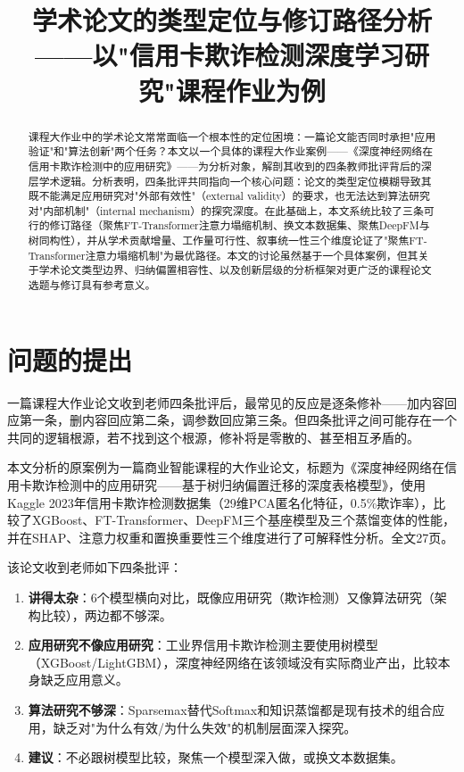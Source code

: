 \documentclass[UTF8,a4paper,12pt,fontset=fandol]{ctexart}
\title{\heiti\zihao{2} 学术论文的类型定位与修订路径分析 \\
       \large ——以"信用卡欺诈检测深度学习研究"课程作业为例}
\date{}
\begin{document}
\maketitle

\begin{abstract}
\noindent
课程大作业中的学术论文常常面临一个根本性的定位困境：一篇论文能否同时承担"应用验证"和"算法创新"两个任务？本文以一个具体的课程大作业案例——《深度神经网络在信用卡欺诈检测中的应用研究》——为分析对象，解剖其收到的四条教师批评背后的深层学术逻辑。分析表明，四条批评共同指向一个核心问题：论文的类型定位模糊导致其既不能满足应用研究对"外部有效性"（external validity）的要求，也无法达到算法研究对"内部机制"（internal mechanism）的探究深度。在此基础上，本文系统比较了三条可行的修订路径（聚焦FT-Transformer注意力塌缩机制、换文本数据集、聚焦DeepFM与树同构性），并从学术贡献增量、工作量可行性、叙事统一性三个维度论证了"聚焦FT-Transformer注意力塌缩机制"为最优路径。本文的讨论虽然基于一个具体案例，但其关于学术论文类型边界、归纳偏置相容性、以及创新层级的分析框架对更广泛的课程论文选题与修订具有参考意义。
\end{abstract}

\section{问题的提出}

一篇课程大作业论文收到老师四条批评后，最常见的反应是逐条修补——加内容回应第一条，删内容回应第二条，调参数回应第三条。但四条批评之间可能存在一个共同的逻辑根源，若不找到这个根源，修补将是零散的、甚至相互矛盾的。

本文分析的原案例为一篇商业智能课程的大作业论文，标题为《深度神经网络在信用卡欺诈检测中的应用研究——基于树归纳偏置迁移的深度表格模型》，使用Kaggle 2023年信用卡欺诈检测数据集（29维PCA匿名化特征，0.5\%欺诈率），比较了XGBoost、FT-Transformer、DeepFM三个基座模型及三个蒸馏变体的性能，并在SHAP、注意力权重和置换重要性三个维度进行了可解释性分析。全文27页。

该论文收到老师如下四条批评：

\begin{enumerate}
    \item \textbf{讲得太杂}：6个模型横向对比，既像应用研究（欺诈检测）又像算法研究（架构比较），两边都不够深。
    \item \textbf{应用研究不像应用研究}：工业界信用卡欺诈检测主要使用树模型（XGBoost/LightGBM），深度神经网络在该领域没有实际商业产出，比较本身缺乏应用意义。
    \item \textbf{算法研究不够深}：Sparsemax替代Softmax和知识蒸馏都是现有技术的组合应用，缺乏对"为什么有效/为什么失效"的机制层面深入探究。
    \item \textbf{建议}：不必跟树模型比较，聚焦一个模型深入做，或换文本数据集。
\end{enumerate}
\end{document}
